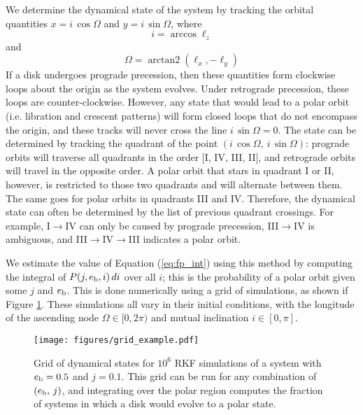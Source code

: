 \documentclass[twocolumn]{aastex631}
\DeclareMathOperator{\arctantwo}{arctan2}
\begin{document}
We determine the dynamical state of the system by tracking the orbital quantities $x=i\,\cos{\Omega}$ and $y=i\,\sin{\Omega}$, where
\begin{equation}
    i = \arccos{\ell_z}
    \label{eq:inclination}
\end{equation}
and
\begin{equation}
    \Omega = \arctantwo (\ell_x, -\ell_y)
    \label{eq:omega}
\end{equation}
If a disk undergoes prograde precession, then these quantities form clockwise loops about the origin as the system evolves. Under retrograde precession, these loops are counter-clockwise. However, any state that would lead to a polar orbit (i.e. libration and crescent patterns) will form closed loops that do not encompass the origin, and these tracks will never cross the line $i\,\sin{\Omega}=0$. The state can be determined by tracking the quadrant of the point $(i\,\cos{\Omega},~i\,\sin{\Omega})$: prograde orbits will traverse all quadrants in the order [I, IV, III, II], and retrograde orbits will travel in the opposite order. A polar orbit that stars in quadrant I or II, however, is restricted to those two quadrants and will alternate between them. The same goes for polar orbits in quadrants III and IV. Therefore, the dynamical state can often be determined by the list of previous quadrant crossings. For example, I$\rightarrow$IV can only be caused by prograde precession, III$\rightarrow$IV is ambiguous, and III$\rightarrow$IV$\rightarrow$III indicates a polar orbit.

We estimate the value of Equation (\ref{eq:fp_int}) using this method by computing the integral of $P(j,e_{\rm b},i)\,di$ over all $i$; this is the probability of a polar orbit given some $j$ and $e_{\rm b}$. This is done numerically using a grid of simulations, as shown if Figure \ref{fig:grid_example}. These simulations all vary in their initial conditions, with the longitude of the ascending node $\Omega \in [0,2\pi)$ and mutual inclination $i \in [0,\pi]$.

\begin{figure}
    \begin{centering}
        \texttt{[image: figures/grid\_example.pdf]}
    \end{centering}
    \caption{
        Grid of dynamical states for $10^6$ RKF simulations of a system with $e_{\rm b}=0.5$ and $j=0.1$. This grid can be run for any combination of $(e_{\rm b},\,j)$, and integrating over the polar region computes the fraction of systems in which a disk would evolve to a polar state.
    }
    \label{fig:grid_example}
\end{figure}
\end{document}
